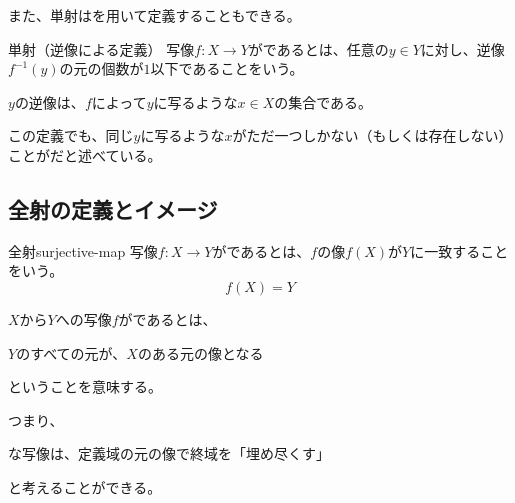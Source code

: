 \documentclass[../../../topic_linear-algebra]{subfiles}
\begin{document}
\begin{center}
\end{center}

また、単射はを用いて定義することもできる。

\begin{definition*}{単射（逆像による定義）}
  写像$f\colon X \to Y$がであるとは、任意の$y \in Y$に対し、逆像$f^{-1}(y)$の元の個数が$1$以下であることをいう。
\end{definition*}

$y$の逆像は、$f$によって$y$に写るような$x \in X$の集合である。

この定義でも、同じ$y$に写るような$x$がただ一つしかない（もしくは存在しない）ことがだと述べている。

\subsection{全射の定義とイメージ}

\begin{definition}{全射}{surjective-map}
  写像$f\colon X \to Y$がであるとは、$f$の像$f(X)$が$Y$に一致することをいう。
  \begin{equation*}
    f(X) = Y
  \end{equation*}
\end{definition}

$X$から$Y$への写像$f$がであるとは、
\begin{emphabox}
  \begin{spacebox}
    \begin{center}
      $Y$のすべての元が、$X$のある元の像となる
    \end{center}
  \end{spacebox}
\end{emphabox}
ということを意味する。

\br

つまり、
\begin{emphabox}
  \begin{spacebox}
    \begin{center}
      な写像は、定義域の元の像で終域を「埋め尽くす」
    \end{center}
  \end{spacebox}
\end{emphabox}
と考えることができる。
\end{document}
